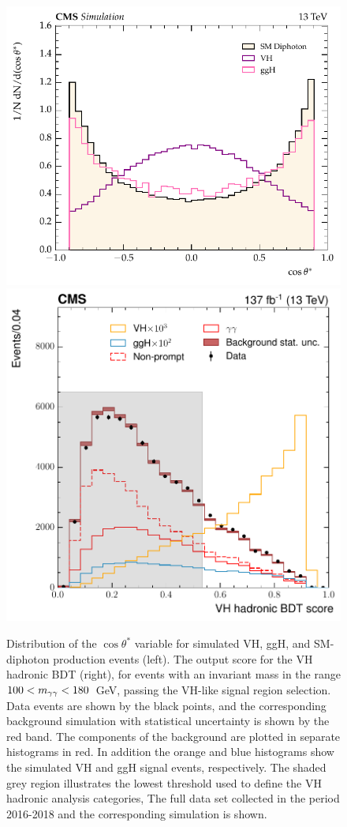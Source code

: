 \begin{figure}
  \centering
  \includegraphics[width=.49\textwidth]{Figures/hgg_overview/cosThetaStar.pdf}
  \includegraphics[width=.49\textwidth]{Figures/hgg_overview/VHhadBDT_DD_VH_had_mvascore_no_stack.pdf}
  \caption[VH hadronic BDT output score]
  {
    Distribution of the $\cos{\theta^*}$ variable for simulated VH, ggH, and SM-diphoton production events (left). The output score for the VH hadronic BDT (right), for events with an invariant mass in the range $100<m_{\gamma\gamma}<180$~GeV, passing the VH-like signal region selection. Data events are shown by the black points, and the corresponding background simulation with statistical uncertainty is shown by the red band. The components of the background are plotted in separate histograms in red. In addition the orange and blue histograms show the simulated VH and ggH signal events, respectively. The shaded grey region illustrates the lowest threshold used to define the VH hadronic analysis categories, The full data set collected in the period 2016-2018 and the corresponding simulation is shown.
  }
  \label{fig:categorisation_vhhad}
\end{figure}

